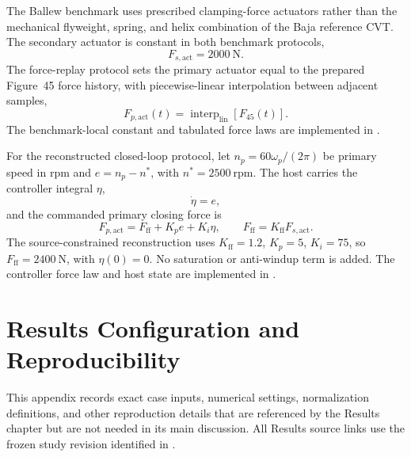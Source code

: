 \documentclass[11pt]{report}
\numberwithin{equation}{section}
\begin{document}
The Ballew benchmark uses prescribed clamping-force actuators rather than the
mechanical flyweight, spring, and helix combination of the Baja reference CVT.
The secondary actuator is constant in both benchmark protocols,
\begin{equation}
F_{s,\mathrm{act}}=\SI{2000}{\newton}.
\label{eq:ballew_secondary_constant_force}
\end{equation}
The force-replay protocol sets the primary actuator equal to the prepared
Figure~45 force history, with piecewise-linear interpolation between adjacent
samples,
\begin{equation}
F_{p,\mathrm{act}}(t)
=
\operatorname{interp}_{\mathrm{lin}}\!\left[F_{45}(t)\right].
\label{eq:ballew_primary_force_replay}
\end{equation}
The benchmark-local constant and tabulated force laws are implemented in
.

For the reconstructed closed-loop protocol, let
\(n_p=60\omega_p/(2\pi)\) be primary speed in rpm and
\(e=n_p-n^*\), with \(n^*=2500~\mathrm{rpm}\). The host carries the controller
integral \(\eta\),
\begin{equation}
\dot\eta=e,
\label{eq:ballew_controller_integral}
\end{equation}
and the commanded primary closing force is
\begin{equation}
F_{p,\mathrm{act}}
=
F_{\mathrm{ff}}+K_p e+K_i\eta,
\qquad
F_{\mathrm{ff}}=K_{\mathrm{ff}}F_{s,\mathrm{act}}.
\label{eq:ballew_pi_force_law}
\end{equation}
The source-constrained reconstruction uses
\(K_{\mathrm{ff}}=1.2\), \(K_p=5\), \(K_i=75\), so
\(F_{\mathrm{ff}}=\SI{2400}{\newton}\), with \(\eta(0)=0\). No saturation or
anti-windup term is added. The controller force law and host state are
implemented in
.

\chapter{Results Configuration and Reproducibility}
\label{app:study_reproducibility}

This appendix records exact case inputs, numerical settings, normalization
definitions, and other reproduction details that are referenced by the Results
chapter but are not needed in its main discussion. All Results source links
use the frozen study revision identified in
.
\end{document}
